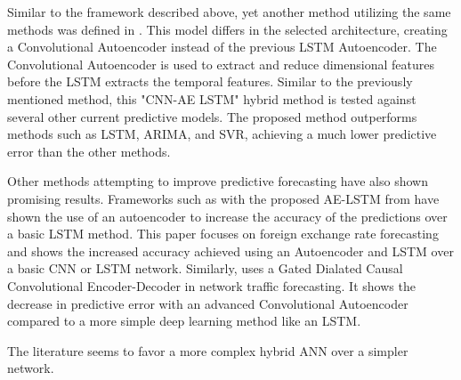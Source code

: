 Similar to the framework described above, yet another method utilizing the same methods was defined in \cite{Zhao2019}.
This model differs in the selected architecture, creating a Convolutional Autoencoder instead of the previous LSTM Autoencoder.
The Convolutional Autoencoder is used to extract and reduce dimensional features before the LSTM extracts the temporal features.
Similar to the previously mentioned method, this "CNN-AE LSTM" hybrid method is tested against several other current predictive models.
The proposed method outperforms methods such as LSTM, ARIMA, and SVR, achieving a much lower predictive error than the other methods.


Other methods attempting to improve predictive forecasting have also shown promising results.
Frameworks such as with the proposed AE-LSTM from \cite{VanHoa2021} have shown the use of an autoencoder to increase the accuracy of the predictions over a basic LSTM method.
This paper focuses on foreign exchange rate forecasting and shows the increased accuracy achieved using an Autoencoder and LSTM over a basic CNN or LSTM network.
Similarly, \cite{Zhang2020} uses a Gated Dialated Causal Convolutional Encoder-Decoder in network traffic forecasting.
It shows the decrease in predictive error with an advanced Convolutional Autoencoder compared to a more simple deep learning method like an LSTM.

The literature seems to favor a more complex hybrid ANN over a simpler network.




\iffalse
  The proposed problem-space has data with high fluctuations and noise.
  In order to increase the predictive abilities of a model, a method well suited for working with data with high noise should be selected.
  A CNN-AE model should be able to solve this problem.
  The CNN is able to extract the spatial features of the data while the AE can filter out the noise and fluctuations in the data.
  By then adding a LSTM network at the end, the model should be able to extract the temoral featrues from the data.
  This hybrid framework should therefore be well suited for the task at hand.
\fi
